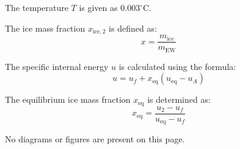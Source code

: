 The temperature \( T \) is given as \( 0.003^\circ\text{C} \).  

The ice mass fraction \( x_{\text{ice},2} \) is defined as:  
\[
x = \frac{m_{\text{ice}}}{m_{\text{EW}}}
\]  

The specific internal energy \( u \) is calculated using the formula:  
\[
u = u_f + x_{\text{eq}} (u_{\text{eq}} - u_A)
\]  

The equilibrium ice mass fraction \( x_{\text{eq}} \) is determined as:  
\[
x_{\text{eq}} = \frac{u_2 - u_f}{u_{\text{eq}} - u_f}
\]  

No diagrams or figures are present on this page.